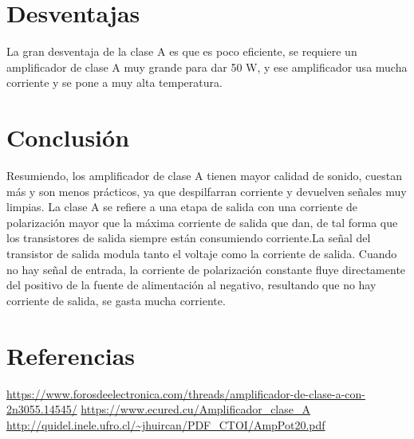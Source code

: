 \documentclass[10pt,a4paper]{article}
\begin{document}
\section{Desventajas}
La gran desventaja de la clase A es que es poco eficiente, se requiere un amplificador de clase A muy grande para dar 50 W, y ese amplificador usa mucha corriente y se pone a muy alta temperatura.
\section{Conclusión}
Resumiendo, los amplificador de clase A tienen mayor calidad de sonido, cuestan más y son menos prácticos, ya que despilfarran corriente y devuelven señales muy limpias. La clase A se refiere a una etapa de salida con una corriente de polarización mayor que la máxima corriente de salida que dan, de tal forma que los transistores de salida siempre están consumiendo corriente.La señal del transistor de salida modula tanto el voltaje como la corriente de salida. Cuando no hay señal de entrada, la corriente de polarización constante fluye directamente del positivo de la fuente de alimentación al negativo, resultando que no hay corriente de salida, se gasta mucha corriente.\\ 
\section{Referencias}
\url{https://www.forosdeelectronica.com/threads/amplificador-de-clase-a-con-2n3055.14545/}
\url{https://www.ecured.cu/Amplificador_clase_A}
\url{http://quidel.inele.ufro.cl/~jhuircan/PDF_CTOI/AmpPot20.pdf}
\end{document}
